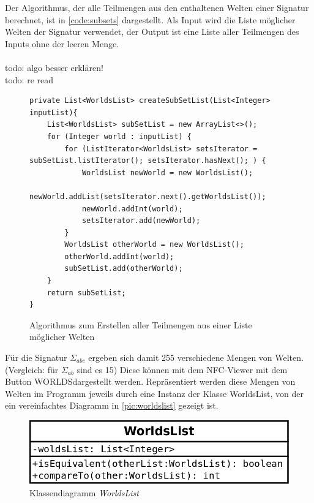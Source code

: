 \documentclass[12pt,a4paper]{article}
\begin{document}
Der Algorithmus, der alle Teilmengen aus den enthaltenen Welten einer Signatur berechnet, ist in \autoref{code:subsets} dargestellt. Als Input wird die Liste möglicher Welten der Signatur verwendet, der Output ist eine Liste aller Teilmengen des Inputs ohne der leeren Menge. \\
\\todo: algo besser erklären! \\
todo: re read \\



\begin{figure}
\begin{lstlisting}
private List<WorldsList> createSubSetList(List<Integer> inputList){
    List<WorldsList> subSetList = new ArrayList<>();
    for (Integer world : inputList) {
        for (ListIterator<WorldsList> setsIterator = subSetList.listIterator(); setsIterator.hasNext(); ) {
            WorldsList newWorld = new WorldsList();
            newWorld.addList(setsIterator.next().getWorldsList());
            newWorld.addInt(world);
            setsIterator.add(newWorld);
        }
        WorldsList otherWorld = new WorldsList();
        otherWorld.addInt(world);
        subSetList.add(otherWorld);
    }
    return subSetList;
}
\end{lstlisting}
\caption{Algorithmus zum Erstellen aller Teilmengen aus einer Liste möglicher Welten}
\label{code:subsets}
\end{figure}






Für die Signatur $\Sigma_{abc}$ ergeben sich damit 255 verschiedene Mengen von Welten. (Vergleich: für $\Sigma_{ab}$ sind es 15) Diese können mit dem NFC-Viewer mit dem Button \glqq WORLDS\grqq \space dargestellt werden. Repräsentiert werden diese Mengen von Welten im Programm jeweils durch eine Instanz der Klasse WorldsList, von der ein vereinfachtes Diagramm in \autoref{pic:worldslist} gezeigt ist. 


\begin{figure}
\includegraphics[width=0.45\linewidth]{bilder/worldslist.png}
\caption{Klassendiagramm \textit{WorldsList}}
\label{pic:worldslist}
\end{figure}
\end{document}
